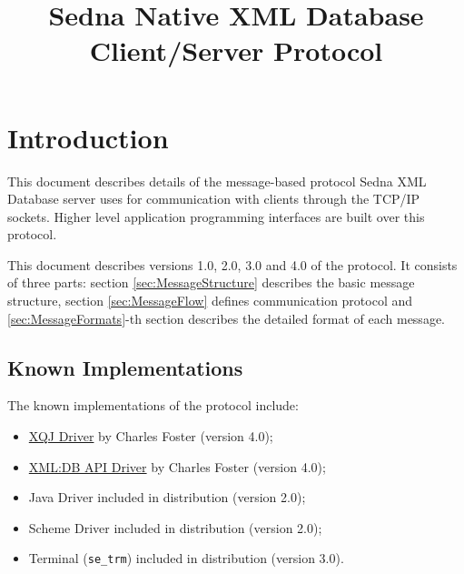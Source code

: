 \documentclass[a4paper,12pt]{article}
\title{Sedna Native XML Database Client/Server Protocol}
\date{}
\newcommand{\TocAt}[6]{}   %
\begin{document}
\sloppy
\maketitle

\TocAt*{section,subsection,subsubsection}
\TocAt*{subsection,subsubsection}

\tableofcontents
\newpage

\section{Introduction}
This document describes details of the message-based protocol Sedna XML Database
server uses for communication with clients through the TCP/IP sockets. Higher
level application programming interfaces are built over this protocol.

This document describes versions 1.0, 2.0, 3.0 and 4.0 of the protocol. It
consists of three parts: section \ref{sec:MessageStructure} describes the basic
message structure, section \ref{sec:MessageFlow} defines communication protocol
and \ref{sec:MessageFormats}-th section describes the detailed format of each
message.


\subsection{Known Implementations}

The known implementations of the protocol include:
\begin{itemize}
\item \href{http://www.cfoster.net/sedna/xqj/}{XQJ Driver} by Charles Foster
(version 4.0);
\item \href{http://www.cfoster.net/sedna/}{XML:DB API Driver} by Charles Foster
(version 4.0);
\item Java Driver included in distribution (version 2.0);
\item Scheme Driver included in distribution (version 2.0);
\item Terminal (\verb!se_trm!) included in distribution (version 3.0).
\end{itemize}

\newpage


\end{document}
